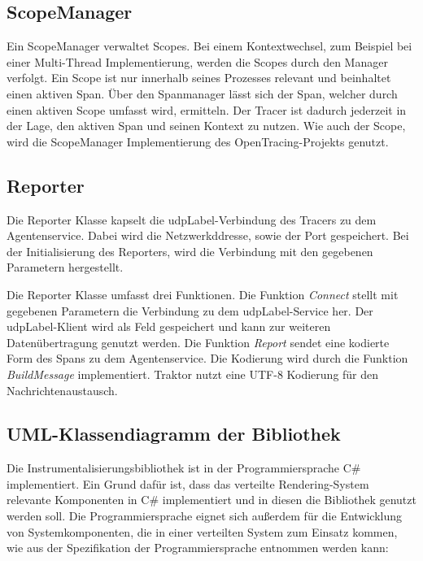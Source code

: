 \subsection{ScopeManager}
\label{subsection:ScopeManager}
Ein ScopeManager verwaltet Scopes. Bei einem Kontextwechsel, zum Beispiel bei einer Multi-Thread Implementierung, werden die Scopes durch den Manager verfolgt. Ein Scope ist nur innerhalb seines Prozesses relevant und beinhaltet einen aktiven Span. Über den Spanmanager lässt sich der Span, welcher durch einen aktiven Scope umfasst wird, ermitteln. Der Tracer ist dadurch jederzeit in der Lage, den aktiven Span und seinen Kontext zu nutzen. Wie auch der Scope, wird die ScopeManager Implementierung des OpenTracing-Projekts genutzt. 

\subsection{Reporter}
\label{subsection:Reporter}
Die Reporter Klasse kapselt die \gls{udpLabel}-Verbindung des Tracers zu dem Agentenservice. Dabei wird die Netzwerkddresse, sowie der Port gespeichert. Bei der Initialisierung des Reporters, wird die Verbindung mit den gegebenen Parametern hergestellt.

Die Reporter Klasse umfasst drei Funktionen. Die Funktion \emph{Connect} stellt mit gegebenen Parametern die Verbindung zu dem \gls{udpLabel}-Service her. Der \gls{udpLabel}-Klient wird als Feld gespeichert und kann zur weiteren Datenübertragung genutzt werden. Die Funktion \emph{Report} sendet eine kodierte Form des Spans zu dem Agentenservice. Die Kodierung wird durch die Funktion \emph{BuildMessage} implementiert. Traktor nutzt eine UTF-8 Kodierung für den Nachrichtenaustausch.

\subsection{UML-Klassendiagramm der Bibliothek}
\label{subsection:UML-Klassendiagramm der Bibliothek}

Die Instrumentalisierungsbibliothek ist in der Programmiersprache C\# implementiert. Ein Grund dafür ist, dass das verteilte Rendering-System relevante Komponenten in C\# implementiert und in diesen die Bibliothek genutzt werden soll. Die Programmiersprache eignet sich außerdem für die Entwicklung von Systemkomponenten, die in einer verteilten System zum Einsatz kommen, wie aus der Spezifikation der Programmiersprache entnommen werden kann: 

